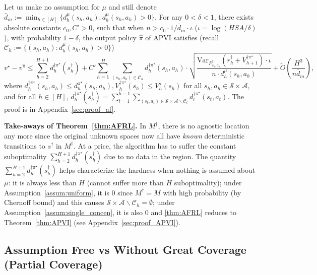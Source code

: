 \begin{theorem}\label{thm:AFRL}
	Let us make no assumption for $\mu$ and still denote $\bar{d}_m:=\min_{h\in[H]}\{d^\mu_h(s_h,a_h):d^\mu_h(s_h,a_h)>0\}$. For any $0<\delta<1$, there exists absolute constants $c_0,C'>0$, such that when $n>c_0 \cdot 1/\bar{d}_m\cdot\iota$ ($\iota=\log(HSA/\delta)$), with probability $1-\delta$, the output policy $\widehat{\pi}$ of APVI satisfies (recall $\mathcal{C}_h:=\{(s_h,a_h):d^\mu_h(s_h,a_h)>0\}$)
	{\small
	\begin{equation}\label{eqn:AFRL}
	 v^\star-v^{\widehat{\pi}}\leq \sum_{h=2}^{H+1}d^{\dagger\pi^\star}_h(s^\dagger_h)+C'\sum_{h=1}^H\sum_{(s_h,a_h)\in\mathcal{C}_h}d^{\dagger\pi^\star}_h(s_h,a_h)\cdot\sqrt{\frac{\mathrm{Var}_{P^\dagger_{s_h,a_h}}(r^\dagger_h+V^{\dagger\pi^\star}_{h+1})\cdot\iota}{ n\cdot d^\mu_h{(s_h,a_h)}}}+\widetilde{O}\left(\frac{H^3}{n\bar{d}_m}\right),
	\end{equation}
}where $d^{\dagger\pi^\star}_h(s_h,a_h)\leq d^{\pi^\star}_h(s_h,a_h),V^{\dagger\pi^\star}_h(s_h)\leq V^\star_h(s_h)$ for all $s_h,a_h\in\mathcal{S}\times\mathcal{A}$, and for all $h\in[H]$, $d^{\dagger\pi^\star}_h(s^\dagger_h)=\sum_{t=1}^{h-1}\sum_{(s_t,a_t)\in\mathcal{S}\times\mathcal{A}\backslash\mathcal{C}_t}d^{\dagger\pi^\star}_t(s_t,a_t)$. The proof is in Appendix~\ref{sec:proof_af}.
\end{theorem}

\textbf{Take-aways of Theorem~\ref{thm:AFRL}.} In $M^\dagger$, there is no agnostic location any more since the original unknown spaces now all have \emph{known} deterministic transitions to $s^\dagger$ in $M^\dagger$. At a price, the algorithm has to suffer the constant suboptimality $\sum_{h=2}^{H+1}d^{\dagger\pi^\star}_h(s^\dagger_h)$ due to no data in the region. The quantity $\sum_{h=2}^{H+1}d^{\dagger\pi^\star}_h(s^\dagger_h)$ helps characterize the hardness when nothing is assumed about $\mu$: it is always less than $H$ (cannot suffer more than $H$ suboptimality); under Assumption~\ref{assum:uniform}, it is $0$ since $M^\dagger=M$ with high probability (by Chernoff bound) and this causes $\mathcal{S}\times\mathcal{A}\backslash \mathcal{C}_h=\emptyset$; under Assumption~\ref{assum:single_concen}, it is also $0$ and \ref{thm:AFRL} reduces to Theorem~\ref{thm:APVI} (see Appendix~\ref{sec:proof_APVI}).


\subsection{Assumption Free vs Without Great Coverage (Partial Coverage)}

